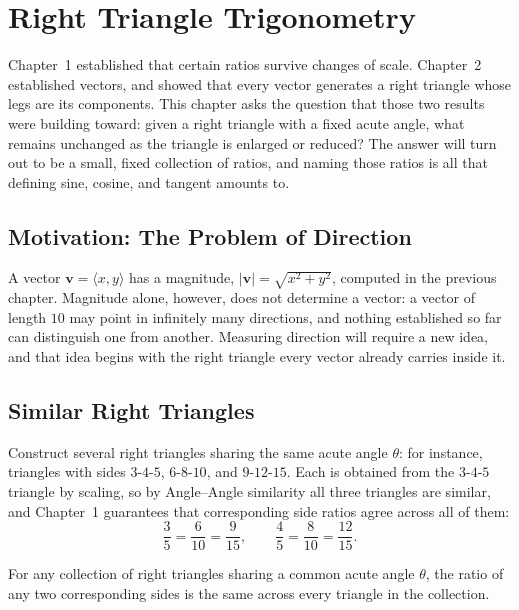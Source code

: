 \chapter{Right Triangle Trigonometry}
\label{ch:ch03-right-triangle}

Chapter~1 established that certain ratios survive changes of scale. Chapter~2
established vectors, and showed that every vector generates a right
triangle whose legs are its components. This chapter asks the question that
those two results were building toward: given a right triangle with a fixed
acute angle, what remains unchanged as the triangle is enlarged or reduced?
The answer will turn out to be a small, fixed collection of ratios, and
naming those ratios is all that defining sine, cosine, and tangent amounts
to.

\section{Motivation: The Problem of Direction}

A vector $\mathbf{v} = \langle x,y \rangle$ has a magnitude,
$|\mathbf{v}| = \sqrt{x^2+y^2}$, computed in the previous chapter. Magnitude
alone, however, does not determine a vector: a vector of length $10$ may
point in infinitely many directions, and nothing established so far can
distinguish one from another. Measuring direction will require a new idea,
and that idea begins with the right triangle every vector already carries
inside it.

\section{Similar Right Triangles}

Construct several right triangles sharing the same acute angle $\theta$: for
instance, triangles with sides $3$-$4$-$5$, $6$-$8$-$10$, and $9$-$12$-$15$.
Each is obtained from the $3$-$4$-$5$ triangle by scaling, so by
Angle--Angle similarity all three triangles are similar, and Chapter~1
guarantees that corresponding side ratios agree across all of them:
\[
\frac{3}{5} = \frac{6}{10} = \frac{9}{15}, \qquad
\frac{4}{5} = \frac{8}{10} = \frac{12}{15}.
\]

\begin{theorem}
For any collection of right triangles sharing a common acute angle $\theta$,
the ratio of any two corresponding sides is the same across every triangle
in the collection.
\end{theorem}


